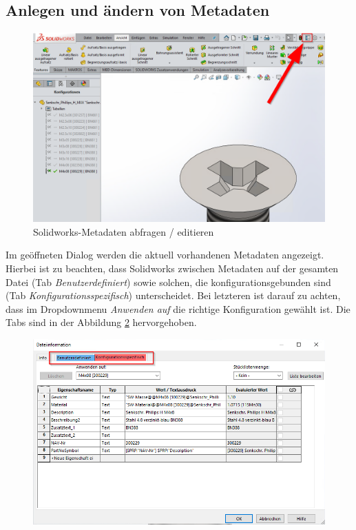 \documentclass[12pt,a4paper]{article}
\begin{document}
	\subsection{Anlegen und ändern von Metadaten}
	\begin{figure}[H]
		\centering
		\includegraphics[width=1\linewidth]{310123_CAD_PDM/screenshot001}
		\caption[Solidworks-Metadaten abfragen / editieren]{Solidworks-Metadaten abfragen / editieren}
		\label{fig:metadataDialog}
	\end{figure}
	Im geöffneten Dialog werden die aktuell vorhandenen Metadaten angezeigt. Hierbei ist zu beachten, dass Solidworks zwischen Metadaten auf der gesamten Datei (Tab \textit{Benutzerdefiniert}) sowie solchen, die konfigurationsgebunden sind (Tab \textit{Konfigurationsspezifisch}) unterscheidet. Bei letzteren ist darauf zu achten, dass im Dropdownmenu \textit{Anwenden auf} die richtige Konfiguration gewählt ist. Die Tabs sind in der Abbildung \ref{fig:screenshot002} hervorgehoben.
	\begin{figure}
		\centering
		\includegraphics[width=1\linewidth]{310123_CAD_PDM/screenshot002}
		\caption{}
		\label{fig:screenshot002}
	\end{figure}
\end{document}
